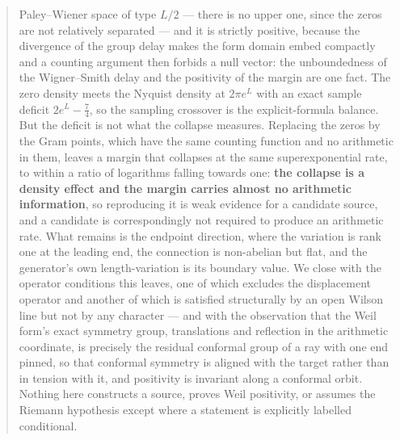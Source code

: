 \documentclass[11pt]{article}
\numberwithin{equation}{section}
\theoremstyle{definition}
\theoremstyle{remark}
\begin{document}
\begin{abstract}
Paley--Wiener space of type $L/2$ --- there is no upper one, since the zeros are
not relatively separated --- and it is strictly positive, because the divergence
of the group delay makes the form domain embed compactly and a counting argument
then forbids a null vector: the unboundedness of the Wigner--Smith delay and the
positivity of the margin are one fact. The zero density meets the Nyquist density
at $2\pi e^L$ with an exact sample deficit $2e^L-\frac74$, so the sampling
crossover is the explicit-formula balance. But the deficit is not what the
collapse measures. Replacing the zeros by the Gram points, which have the same
counting function and no arithmetic in them, leaves a margin that collapses at the
same superexponential rate, to within a ratio of logarithms falling towards one:
\textbf{the collapse is a density effect and the margin carries almost no
arithmetic information}, so reproducing it is weak evidence for a candidate
source, and a candidate is correspondingly not required to produce an arithmetic
rate. What remains is the endpoint direction, where the variation is rank one at
the leading end,
the connection is non-abelian but flat, and the generator's own length-variation
is its boundary value. We close with the operator conditions this leaves, one of
which excludes the displacement operator and another of which is satisfied
structurally by an open Wilson line but not by any character --- and with the
observation that the Weil form's exact symmetry group, translations and
reflection in the arithmetic coordinate, is precisely the residual conformal
group of a ray with one end pinned, so that conformal symmetry is aligned with
the target rather than in tension with it, and positivity is invariant along a
conformal orbit. Nothing here
constructs a source, proves Weil positivity, or assumes the Riemann hypothesis
except where a statement is explicitly labelled conditional.
\end{abstract}

\clearpage
{\small\tableofcontents}
\clearpage










\appendix

\clearpage
{}
{}

\end{document}
